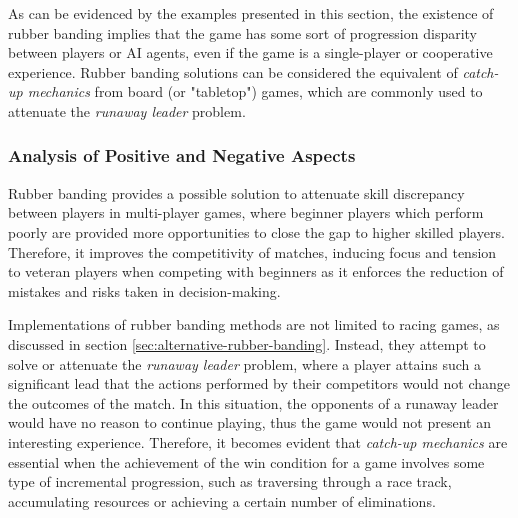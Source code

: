 As can be evidenced by the examples presented in this section, the existence of rubber banding implies that the game has some sort of progression disparity between players or AI agents, even if the game is a single-player or cooperative experience. Rubber banding solutions can be considered the equivalent of \emph{catch-up mechanics} from board (or "tabletop") games, which are commonly used to attenuate the \emph{runaway leader} problem.


\subsubsection{Analysis of Positive and Negative Aspects}

Rubber banding provides a possible solution to attenuate skill discrepancy between players in multi-player games, where beginner players which perform poorly are provided more opportunities to close the gap to higher skilled players.  Therefore, it improves the competitivity of matches, inducing focus and tension to veteran players when competing with beginners as it enforces the reduction of mistakes and risks taken in decision-making.

Implementations of rubber banding methods are not limited to racing games, as discussed in section \ref{sec:alternative-rubber-banding}. Instead, they attempt to solve or attenuate the \emph{runaway leader} problem, where a player attains such a significant lead that the actions performed by their competitors would not change the outcomes of the match. In this situation, the opponents of a runaway leader would have no reason to continue playing, thus the game would not present an interesting experience. Therefore, it becomes evident that \emph{catch-up mechanics} are essential when the achievement of the win condition for a game involves some type of incremental progression, such as traversing through a race track, accumulating resources or achieving a certain number of eliminations. 

